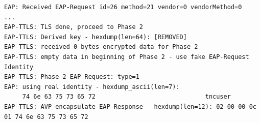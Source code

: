 \begin{lstlisting}[style=eapttls-config]
EAP: Received EAP-Request id=26 method=21 vendor=0 vendorMethod=0
...
EAP-TTLS: TLS done, proceed to Phase 2
EAP-TTLS: Derived key - hexdump(len=64): [REMOVED]
EAP-TTLS: received 0 bytes encrypted data for Phase 2
EAP-TTLS: empty data in beginning of Phase 2 - use fake EAP-Request Identity
EAP-TTLS: Phase 2 EAP Request: type=1
EAP: using real identity - hexdump_ascii(len=7):
     74 6e 63 75 73 65 72                              tncuser
EAP-TTLS: AVP encapsulate EAP Response - hexdump(len=12): 02 00 00 0c 01 74 6e 63 75 73 65 72
\end{lstlisting}

\clearpage